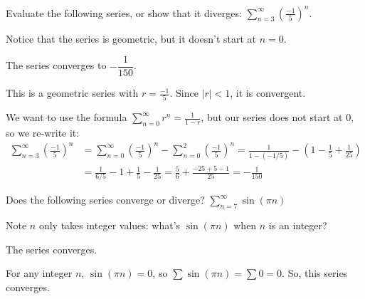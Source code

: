 



\begin{Mquestion}
Evaluate the following series, or show that it diverges:
$\displaystyle\sum_{n=3}^\infty \left(\frac{-1}{5}\right)^n$.
\end{Mquestion}

\begin{hint}
Notice that the series is geometric, but it doesn't start at $n=0$.
\end{hint}

\begin{answer}
The series converges to $-\dfrac{1}{150}$.
\end{answer}

\begin{solution}
This is a geometric series with $r=\frac{-1}{5}$. Since $|r|<1$, it is convergent.

We want to use the formula $\sum_{n=0}^\infty r^n=\frac{1}{1-r}$, but our series does not start at 0, so we re-write it:
\begin{align*}
\sum_{n=3}^\infty \left(\frac{-1}{5}\right)^n&=
\sum_{n=0}^\infty \left(\frac{-1}{5}\right)^n-
\sum_{n=0}^2 \left(\frac{-1}{5}\right)^n
=\frac{1}{1-(-1/5)} - \left(1-\frac{1}{5}+\frac{1}{25} \right)\\
&=\frac{1}{6/5}-1+\frac{1}{5}-\frac{1}{25}
=
\frac{5}{6}+\frac{-25+5-1}{25}=-\frac{1}{150}
\end{align*}
\end{solution}









\begin{question}
Does the following series converge or diverge?
$\displaystyle\sum_{n=7}^\infty \sin(\pi n)$
\end{question}

\begin{hint}
Note $n$ only takes integer values: what's $\sin(\pi n)$ when $n$ is an integer?
\end{hint}

\begin{answer}
The series converges.
\end{answer}

\begin{solution}
For any integer $n$, $\sin(\pi n)=0$, so
$\sum \sin(\pi n)=\sum 0 = 0$. So, this series converges.
\end{solution}


